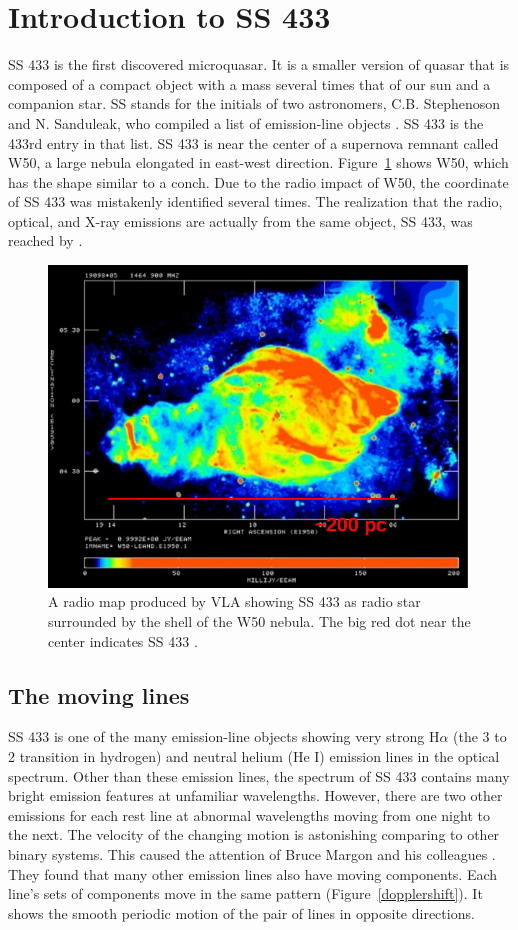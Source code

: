 \section{Introduction to SS 433}

SS 433 is the first discovered microquasar. It is a smaller version of quasar that is composed of a compact object with a mass several times that of our sun and a companion star. SS stands for the initials of two astronomers, C.B. Stephenoson and N. Sanduleak, who compiled a list of emission-line objects \citep{Stephenoson1977}. SS 433 is the 433rd entry in that list. SS 433 is near the center of a supernova remnant called W50, a large nebula elongated in east-west direction. Figure~\ref{w50} shows W50, which has the shape similar to a conch. Due to the radio impact of W50, the coordinate of SS 433 was mistakenly identified several times. The realization that the radio, optical, and X-ray emissions are actually from the same object, SS 433, was reached by \cite{Clark1978}.\par

\begin{figure}[ht]
    \centering
    \includegraphics[width = .8\linewidth]{Chapters/Figures/w50.png}
    \caption{A radio map produced by VLA showing SS 433 as radio star surrounded by the shell of the W50 nebula. The big red dot near the center indicates SS 433 \citep{Dubner1998}.}
    \label{w50}
\end{figure}


\subsection{The moving lines}
SS 433 is one of the many emission-line objects showing very strong H$\alpha$ (the 3 to 2 transition in hydrogen) and neutral helium (He I) emission lines in the optical spectrum. Other than these emission lines, the spectrum of SS 433 contains many bright emission features at unfamiliar wavelengths. However, there are two other emissions for each rest line at abnormal wavelengths moving from one night to the next. The velocity of the changing motion is astonishing comparing to other binary systems. This caused the attention of Bruce Margon and his colleagues \citep{Margon1979}. They found that many other emission lines also have moving components. Each line's sets of components move in the same pattern (Figure~\ref{dopplershift}). It shows the smooth periodic motion of the pair of lines in opposite directions.

